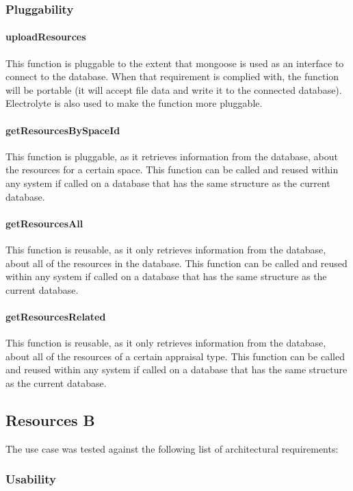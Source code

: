 \documentclass[a4paper]{article}
\begin{document}
\subsubsection {Pluggability}

\paragraph{uploadResources}
This function is pluggable to the extent that mongoose is used as an interface to connect to the database. When that requirement is complied with, the function will be portable (it will accept file data and write it to the connected database). Electrolyte is also used to make the function more pluggable.

\paragraph{getResourcesBySpaceId}
This function is pluggable, as it retrieves information from the database, about the resources for a certain space. This function can be called and reused within any system if called on a database that has the same structure as the current database.

\paragraph{getResourcesAll}
This function is reusable, as it only retrieves information from the database, about all of the resources in the database. This function can be called and reused within any system if called on a database that has the same structure as the current database.

\paragraph{getResourcesRelated}
This function is reusable, as it only retrieves information from the database, about all of the resources of a certain appraisal type. This function can be called and reused within any system if called on a database that has the same structure as the current database.


\subsection {Resources B}
The use case was tested against the following list of architectural requirements:
\subsubsection {Usability}
\end{document}
